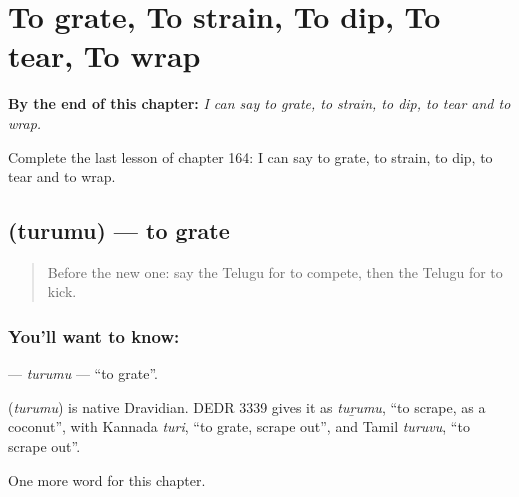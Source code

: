 
\chapter{To grate, To strain, To dip, To tear, To wrap}
\label{ch:te-to-grate-to-strain-to-dip-to-tear-to-wrap}

\begin{chapteropening}
\textbf{By the end of this chapter:} \emph{I can say to grate, to strain, to dip, to tear and to wrap.}

Complete the last lesson of chapter 164: I can say to grate, to strain, to dip, to tear and to wrap.
\end{chapteropening}

\section[\texorpdfstring{\te{తురుము} (turumu)}{తురుము (turumu)}]{ (turumu) — to grate}

\label{lesson:TE-C164-turumu}



\begin{quote}
Before the new one: say the Telugu for to compete, then the Telugu for to kick.
\end{quote}

\subsection*{You'll want to know: }
\textbf{} — \emph{turumu} — \textquotedblleft{}to grate\textquotedblright{}.

\begin{cousinweb}
\textbf{} (\emph{turumu}) is native Dravidian. DEDR 3339 gives it as \emph{tuṟumu}, \textquotedblleft{}to scrape, as a coconut\textquotedblright{}, with Kannada \emph{turi}, \textquotedblleft{}to grate, scrape out\textquotedblright{}, and Tamil \emph{turuvu}, \textquotedblleft{}to scrape out\textquotedblright{}.
\end{cousinweb}

\begin{grammarlens}[title={What you've built}]
One more word for this chapter.
\end{grammarlens}

